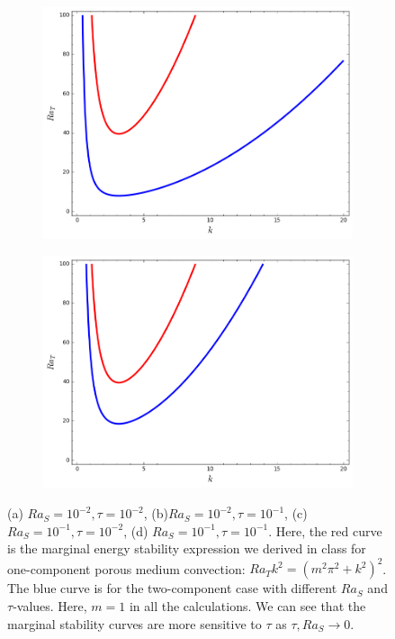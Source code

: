 \documentclass{article}
\begin{document}
\begin{figure}[H]
\begin{subfigure}{.49\textwidth}
  \includegraphics[scale=0.3]{Figs/energy_stab_Ra_T_vs_k_Ra_S_0_1_tau_0_01.png}
  \subcaption{}
  \label{fig:energy_stab_Ra_T_vs_k_Ra_S_0_1_tau_0_01}
    \end{subfigure}
        \begin{subfigure}{.49\textwidth}
  \centering
  \includegraphics[scale=0.3]{Figs/energy_stab_Ra_T_vs_k_Ra_S_0_1_tau_0_1.png}
  \subcaption{}
  \label{fig:energy_stab_Ra_T_vs_k_Ra_S_0_1_tau_0_1}
    \end{subfigure}
  \caption{(a) $Ra_{S} = 10^{-2}, \tau = 10^{-2}$, (b)$Ra_{S} = 10^{-2}, \tau = 10^{-1}$, (c) $Ra_{S} = 10^{-1}, \tau = 10^{-2}$, (d) $Ra_{S} = 10^{-1}, \tau = 10^{-1}$. Here, the red curve is the marginal energy stability expression we derived in class for one-component porous medium convection: $Ra_{T}k^{2} = (m^{2}\pi^{2} + k^{2})^{2}$. The blue curve is for the two-component case with different $Ra_{S}$ and $\tau$-values. Here, $m = 1$ in all the calculations. We can see that the marginal stability curves are more sensitive to $\tau$ as $\tau, Ra_{S} \rightarrow 0$.}
\label{fig:marginal_energy_stab_1}
\end{figure}
\end{document}
